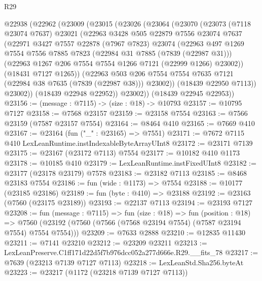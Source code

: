 \begin{lexlean}{R29}
\begin{coremodule}
  @22938
    (@22962
      (@23009
        (@23015
          (@23026
            (@23064
              (@23070
                (@23073
                  (@7118 @23074 @7637)
                  @23021
                  (@22963
                    @3428
                    @505
                    @22879
                    @7556
                    @23074
                    @7637
                    (@22971
                      @3427
                      @7557
                      @22878
                      (@7967 @7823)
                      @23074
                      (@22963
                        @497
                        @1269
                        @7554
                        @7556
                        @7885
                        @7823
                        (@22984 @31 @7885 (@7839 (@22987 @31)))
                        (@22963 @1267 @206 @7554 @7554 @1266 @7121 (@22999 @1266) @23002))
                      (@18431 @7127 @1265))
                    (@22963
                      @503
                      @206
                      @7554
                      @7554
                      @7635
                      @7121
                      (@22984 @38 @7635 (@7839 (@22987 @38)))
                      @23002))
                  (@18439 @22950 @7113))
                @23002))
            (@18439 @22948 @22952))
          @23002))
      (@18439 @22945 @22953))
@23156 := (message : @7115) -> (size : @18) -> @10793
@23157 := @10795 @7127
@23158 := @7568 @23157
@23159 := @23158 @7554
@23163 := @7566 @23159 (@7587 @23157 @7554)
@23164 := @8464 @410
@23165 := @7669 @410
@23167 := @23164 (fun ("_" : @23165) => @7551)
@23171 := @7672 @7115 @410 LexLeanRuntime.instIndexableByteArrayUInt8
@23172 := @23171 @7139
@23175 := @23167 (@23172 @7113) @7554
@23177 := @10182 @410 @1173
@23178 := @10185 @410
@23179 := LexLeanRuntime.instFixedUInt8
@23182 := @23177 (@23178 @23179) @7578
@23183 := @23182 @7113
@23185 := @8468 @23183 @7554
@23186 := fun (wide : @1173) => @7554
@23188 := @10177 (@23185 @23186)
@23189 := fun (byte : @410) => @23188
@23192 := @23163 (@7560 (@23175 @23189))
@23193 := @22137 @7113
@23194 := @23193 @7127
@23208 := fun (message : @7115) =>
  fun (size : @18) =>
  fun (position : @18) =>
  @7560 (@23192 (@7560 (@7566 (@7568 @23194 @7554) (@7587 @23194 @7554) @7554 @7554)))
@23209 := @7633 @2888
@23210 := @12835 @11430
@23211 := @7141 @23210
@23212 := @23209 @23211
@23213 := LexLeanPreserve.C1ff171d22d5f7b976dcc052a277d666e.R29.__fits_78
@23217 := @7639 (@23213 @7139 @7127 @7113)
@23218 := LexLeanStd.Sha256.byteAt
@23223 := @23217 (@1172 (@23218 @7139 @7127 @7113))

\end{coremodule}
\end{lexlean}
